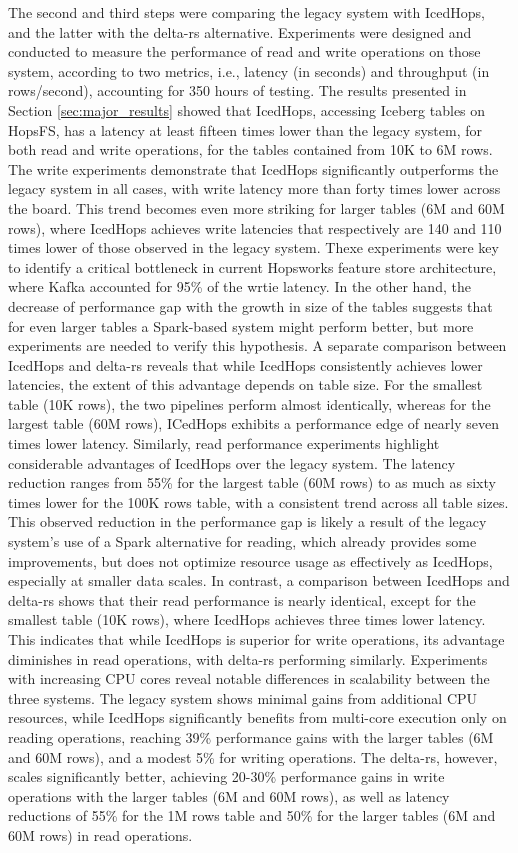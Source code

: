 The second and third steps were comparing the legacy system with IcedHops, and the latter with the delta-rs alternative. Experiments were designed and conducted to measure the performance of read and write operations on those system, according to two metrics, i.e., latency (in seconds) and throughput (in rows/second), accounting for 350 hours of testing. The results presented in Section \ref{sec:major_results} showed that IcedHops, accessing Iceberg tables on \gls{HopsFS}, has a latency at least fifteen times lower than the legacy system, for both read and write operations, for the tables contained from 10K to 6M rows. The write experiments demonstrate that IcedHops significantly outperforms the legacy system in all cases, with write latency more than forty times lower across the board. This trend becomes even more striking for larger tables (6M and 60M rows), where IcedHops achieves write latencies that respectively are 140 and 110 times lower of those observed in the legacy system. Thexe experiments were key to identify a critical bottleneck in current Hopsworks feature store architecture, where Kafka accounted for 95\% of the wrtie latency. In the other hand, the decrease of performance gap with the growth in size of the tables suggests that for even larger tables a Spark-based system might perform better, but more experiments are needed to verify this hypothesis. A separate comparison between IcedHops and delta-rs reveals that while IcedHops consistently achieves lower latencies, the extent of this advantage depends on table size. For the smallest table (10K rows), the two pipelines perform almost identically, whereas for the largest table (60M rows), ICedHops exhibits a performance edge of nearly seven times lower latency. Similarly, read performance experiments highlight considerable advantages of IcedHops over the legacy system. The latency reduction ranges from 55\% for the largest table (60M rows) to as much as sixty times lower for the 100K rows table, with a consistent trend across all table sizes. This observed reduction in the performance gap is likely a result of the legacy system's use of a Spark alternative for reading, which already provides some improvements, but does not optimize resource usage as effectively as IcedHops, especially at smaller data scales. In contrast, a comparison between IcedHops and delta-rs shows that their read performance is nearly identical, except for the smallest table (10K rows), where IcedHops achieves three times lower latency. This indicates that while IcedHops is superior for write operations, its advantage diminishes in read operations, with delta-rs performing similarly. Experiments with increasing \gls{CPU} cores reveal notable differences in scalability between the three systems. The legacy system shows minimal gains from additional \gls{CPU} resources, while IcedHops significantly benefits from multi-core execution only on reading operations, reaching 39\% performance gains with the larger tables (6M and 60M rows), and a modest 5\% for writing operations. The delta-rs, however, scales significantly better, achieving 20-30\% performance gains in write operations with the larger tables (6M and 60M rows), as well as latency reductions of 55\% for the 1M rows table and 50\% for the larger tables (6M and 60M rows) in read operations.

